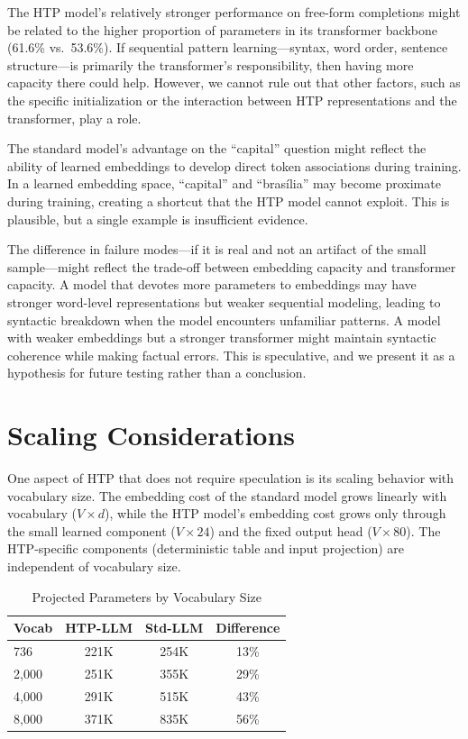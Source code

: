 \documentclass[10pt,twocolumn,a4paper]{article}
\newcommand{\htpname}{HTP}
\newcommand{\htpmodel}{HTP-LLM}
\newcommand{\stdmodel}{Std-LLM}
\begin{document}
The \htpname{} model's relatively stronger performance on free-form completions might be related to the higher proportion of parameters in its transformer backbone (61.6\% vs.\ 53.6\%). If sequential pattern learning---syntax, word order, sentence structure---is primarily the transformer's responsibility, then having more capacity there could help. However, we cannot rule out that other factors, such as the specific initialization or the interaction between \htpname{} representations and the transformer, play a role.

The standard model's advantage on the ``capital'' question might reflect the ability of learned embeddings to develop direct token associations during training. In a learned embedding space, ``capital'' and ``bras\'ilia'' may become proximate during training, creating a shortcut that the \htpname{} model cannot exploit. This is plausible, but a single example is insufficient evidence.

The difference in failure modes---if it is real and not an artifact of the small sample---might reflect the trade-off between embedding capacity and transformer capacity. A model that devotes more parameters to embeddings may have stronger word-level representations but weaker sequential modeling, leading to syntactic breakdown when the model encounters unfamiliar patterns. A model with weaker embeddings but a stronger transformer might maintain syntactic coherence while making factual errors. This is speculative, and we present it as a hypothesis for future testing rather than a conclusion.

\section{Scaling Considerations}
\label{sec:scaling}

One aspect of \htpname{} that does not require speculation is its scaling behavior with vocabulary size. The embedding cost of the standard model grows linearly with vocabulary ($V \times d$), while the \htpname{} model's embedding cost grows only through the small learned component ($V \times 24$) and the fixed output head ($V \times 80$). The \htpname{}-specific components (deterministic table and input projection) are independent of vocabulary size.

\begin{table}[h]
\centering
\caption{Projected Parameters by Vocabulary Size}
\label{tab:scaling}
\begin{tabular}{lccc}
\toprule
\textbf{Vocab} & \textbf{\htpmodel{}} & \textbf{\stdmodel{}} & \textbf{Difference} \\
\midrule
736 & 221K & 254K & 13\% \\
2,000 & 251K & 355K & 29\% \\
4,000 & 291K & 515K & 43\% \\
8,000 & 371K & 835K & 56\% \\
\bottomrule
\end{tabular}
\end{table}
\end{document}

